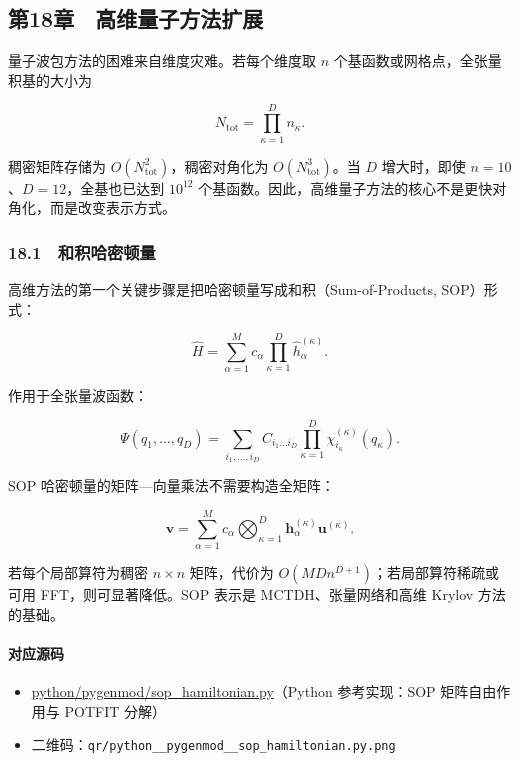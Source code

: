 \documentclass[
]{ctexbook}
\providecommand{\tightlist}{%
  \setlength{\itemsep}{0pt}\setlength{\parskip}{0pt}}
\let\origsubsection\subsection
\renewcommand{\subsection}[1]{%
  \needspace{6\baselineskip}%
  \origsubsection{#1}%
}
\begin{document}
\hypertarget{ux7b2c18ux7ae0-ux9ad8ux7ef4ux91cfux5b50ux65b9ux6cd5ux6269ux5c55}{%
\subsection{第18章　高维量子方法扩展}\label{ux7b2c18ux7ae0-ux9ad8ux7ef4ux91cfux5b50ux65b9ux6cd5ux6269ux5c55}}

量子波包方法的困难来自维度灾难。若每个维度取 \(n\)
个基函数或网格点，全张量积基的大小为

\[
N_{\mathrm{tot}}=\prod_{\kappa=1}^{D}n_\kappa.
\]

稠密矩阵存储为 \(O(N_{\mathrm{tot}}^2)\)，稠密对角化为
\(O(N_{\mathrm{tot}}^3)\)。当 \(D\) 增大时，即使
\(n=10\)、\(D=12\)，全基也已达到 \(10^{12}\)
个基函数。因此，高维量子方法的核心不是更快对角化，而是改变表示方式。

\hypertarget{ux548cux79efux54c8ux5bc6ux987fux91cf}{%
\subsubsection{18.1　和积哈密顿量}\label{ux548cux79efux54c8ux5bc6ux987fux91cf}}

高维方法的第一个关键步骤是把哈密顿量写成和积（Sum-of-Products,
SOP）形式：

\[
\hat H
=
\sum_{\alpha=1}^{M}
c_\alpha
\prod_{\kappa=1}^{D}
\hat h_{\alpha}^{(\kappa)}.
\]

作用于全张量波函数：

\[
\Psi(q_1,\ldots,q_D)
=
\sum_{i_1,\ldots,i_D}
C_{i_1\ldots i_D}
\prod_{\kappa=1}^{D}
\chi_{i_\kappa}^{(\kappa)}(q_\kappa).
\]

SOP 哈密顿量的矩阵---向量乘法不需要构造全矩阵：

\[
\mathbf v
=
\sum_{\alpha=1}^{M}
c_\alpha
\bigotimes_{\kappa=1}^{D}
\mathbf h_{\alpha}^{(\kappa)}
\mathbf u^{(\kappa)}.
\]

若每个局部算符为稠密 \(n\times n\) 矩阵，代价为
\(O(MDn^{D+1})\)；若局部算符稀疏或可用 FFT，则可显著降低。SOP 表示是
MCTDH、张量网络和高维 Krylov 方法的基础。

\hypertarget{ux5bf9ux5e94ux6e90ux7801-80}{%
\paragraph{对应源码}\label{ux5bf9ux5e94ux6e90ux7801-80}}

\begin{itemize}
\tightlist
\item
  \href{https://github.com/l1Ha/QuantumGeneralModule/blob/main/python/pygenmod/sop_hamiltonian.py}{python/pygenmod/sop\_hamiltonian.py}（Python
  参考实现：SOP 矩阵自由作用与 POTFIT 分解）
\item
  二维码：\texttt{qr/python\_\_pygenmod\_\_sop\_hamiltonian.py.png}
\end{itemize}
\end{document}
